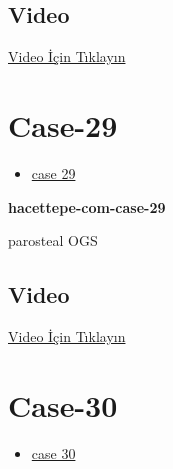 \documentclass[
  letterpaper,
  DIV=11,
  numbers=noendperiod]{scrreprt}
\providecommand{\tightlist}{%
  \setlength{\itemsep}{0pt}\setlength{\parskip}{0pt}}\usepackage{longtable,booktabs,array}
\begin{document}
\hypertarget{video-26}{%
\subsection{Video}\label{video-26}}

\href{https://www.youtube.com/watch?v=yUrabUzw3RI}{Video İçin Tıklayın}

\hypertarget{sec-hacettepe-case-of-the-month-case-29}{%
\section{Case-29}\label{sec-hacettepe-case-of-the-month-case-29}}

\begin{itemize}
\tightlist
\item
  \href{https://www.youtube.com/watch?v=GkGz7NV7JmM\&ab_channel=KemalKosemehmetoglu}{case
  29}
\end{itemize}

\textbf{hacettepe-com-case-29}

\begin{tcolorbox}[enhanced jigsaw, left=2mm, toprule=.15mm, rightrule=.15mm, bottomrule=.15mm, leftrule=.75mm, colback=white, colframe=quarto-callout-tip-color-frame, toptitle=1mm, breakable, titlerule=0mm, colbacktitle=quarto-callout-tip-color!10!white, bottomtitle=1mm, title=\textcolor{quarto-callout-tip-color}{\faLightbulb}\hspace{0.5em}{Tanı}, arc=.35mm, opacitybacktitle=0.6, opacityback=0, coltitle=black]

parosteal OGS

\end{tcolorbox}

\hypertarget{video-27}{%
\subsection{Video}\label{video-27}}

\href{https://www.youtube.com/watch?v=GkGz7NV7JmM}{Video İçin Tıklayın}

\hypertarget{sec-hacettepe-case-of-the-month-case-30}{%
\section{Case-30}\label{sec-hacettepe-case-of-the-month-case-30}}

\begin{itemize}
\tightlist
\item
  \href{https://www.youtube.com/watch?v=az6Fk7bYsQ8\&ab_channel=KemalKosemehmetoglu}{case
  30}
\end{itemize}
\end{document}
